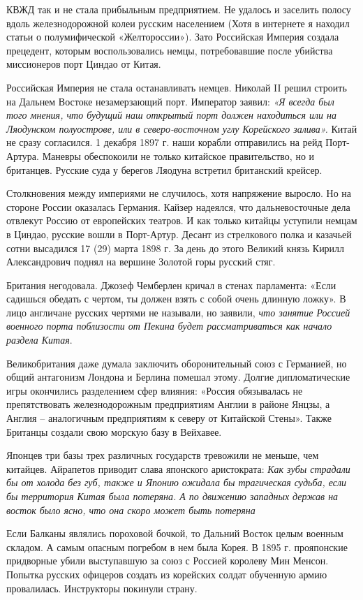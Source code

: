 КВЖД так и не стала прибыльным предприятием. Не удалось и заселить полосу вдоль железнодорожной колеи русским населением (Хотя в интернете я находил статьи о полумифической «Желтороссии»). Зато Российская Империя создала прецедент, которым воспользовались немцы, потребовавшие после убийства миссионеров порт Циндао от Китая.

Российская Империя не стала останавливать немцев. Николай II решил строить на Дальнем Востоке незамерзающий порт. Император заявил: \textit{«Я всегда был того мнения, что будущий наш открытый порт должен находиться или на Ляодунском полуострове, или в северо-восточном углу Корейского залива».} Китай не сразу согласился. 1 декабря 1897 г. наши корабли отправились на рейд Порт-Артура. Маневры обеспокоили не только китайское правительство, но и британцев. Русские суда у берегов Ляодуна встретил британский крейсер.

Столкновения между империями не случилось, хотя напряжение выросло. Но на стороне России оказалась Германия. Кайзер надеялся, что дальневосточные дела отвлекут Россию от европейских театров. И как только китайцы уступили немцам в Циндао, русские вошли в Порт-Артур. Десант из стрелкового полка и казачьей сотни высадился 17 (29) марта 1898 г. За день до этого Великий князь Кирилл Александрович поднял на вершине Золотой горы русский стяг.

Британия негодовала. Джозеф Чемберлен кричал в стенах парламента: «Если садишься обедать с чертом, ты должен взять с собой очень длинную ложку». В лицо англичане русских чертями не называли, но заявили, \textit{что занятие Россией военного порта поблизости от Пекина будет рассматриваться как начало раздела Китая}.

Великобритания даже думала заключить оборонительный союз с Германией, но общий антагонизм Лондона и Берлина помешал этому. Долгие дипломатические игры окончились разделением сфер влияния: «Россия обязывалась не препятствовать железнодорожным предприятиям Англии в районе Янцзы, а Англия – аналогичным предприятиям к северу от Китайской Стены». Также Британцы создали свою морскую базу в Вейхавее.

Японцев три базы трех различных государств тревожили не меньше, чем китайцев. Айрапетов приводит слава японского аристократа: \textit{Как зубы страдали бы от холода без губ, также и Японию ожидала бы трагическая судьба, если бы территория Китая была потеряна. А по движению западных держав на восток было ясно, что она скоро может быть потеряна}

Если Балканы являлись пороховой бочкой, то Дальний Восток целым военным складом. А самым опасным погребом в нем была Корея. В 1895 г. прояпонские придворные убили выступавшую за союз с Россией королеву Мин Менсон. Попытка русских офицеров создать из корейских солдат обученную армию провалилась. Инструкторы покинули страну.

